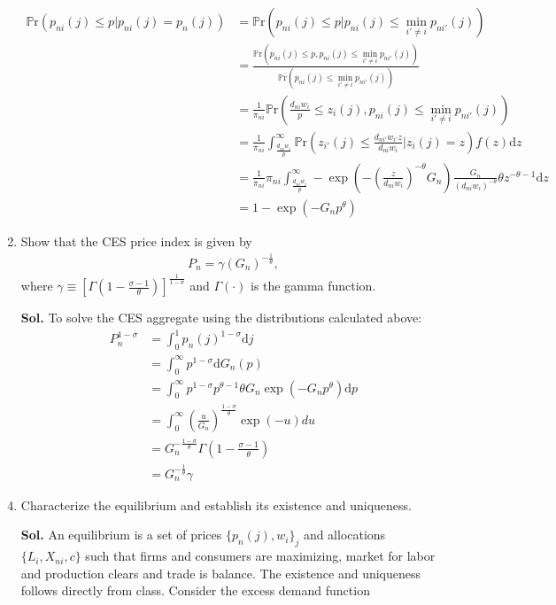 \documentclass[12pt,oneside,reqno]{amsart}
\newcommand{\pr}{\mathbb{P}\mathrm{r}}
\begin{document}
\begin{enumerate}
\begin{align*}
    \pr\left(p_{ni}(j) \leq p \vert p_{ni}(j) = p_n(j)\right) &= \pr\left(p_{ni}(j) \leq p \Big\vert p_{ni}(j) \leq \min_{i' \neq i} p_{ni'}(j)\right) \\
    &= \frac{\pr(p_{ni}(j) \leq p, p_{ni}(j) \leq \min_{i' \neq i} p_{ni'}(j))}{\pr(p_{ni}(j) \leq \min_{i' \neq i} p_{ni'}(j))} \\
    &= \frac{1}{\pi_{ni}} \pr\left(\frac{d_{ni}w_i}{p} \leq z_i(j), p_{ni}(j) \leq \min_{i' \neq i} p_{ni'}(j)\right) \\
    &= \frac{1}{\pi_{ni}} \int_{\frac{d_{ni}w_i}{p}}^\infty \pr\left(z_{i'}(j) \leq \frac{d_{ni'}w_{i'}z}{d_{ni}w_i} \Bigg\vert z_i(j) = z\right) f(z) \mathrm{d}z \\
    &= \frac{1}{\pi_{ni}} \pi_{ni} \int_{\frac{d_{ni}w_i}{p}}^\infty - \exp\left(-\left(\frac{z}{d_{ni}w_i}\right)^{-\theta} G_n \right) \frac{G_n}{(d_{ni}w_i)^{-\theta}} \theta z^{-\theta-1} \mathrm{d}z \\
    &= 1 - \exp(-G_n p^\theta)
\end{align*}
    \item Show that the CES price index is given by
    \begin{align*}
        P_n=\gamma\left(G_n\right)^{-\frac{1}{\theta}},
    \end{align*}
    where $\gamma \equiv\left[\Gamma\left(1-\frac{\sigma-1}{\theta}\right)\right]^{\frac{1}{1-\sigma}}$ and $\Gamma(\cdot)$ is the gamma function.
    \item[\textbf{Sol.}] To solve the CES aggregate using the distributions calculated above:
    \begin{align*}
    P_n^{1-\sigma} &= \int_0^1 p_n(j)^{1-\sigma} \mathrm{d}j \\
    &= \int_0^\infty p^{1-\sigma} \mathrm{d}G_n(p) \\
    &= \int_0^\infty p^{1-\sigma} p^{\theta-1} \theta G_n \exp(-G_n p^\theta) \mathrm{d}p \tag{Let $u = G_n p^\theta$} \\ 
    &= \int_0^\infty \left(\frac{u}{G_n}\right)^{\frac{1-\sigma}{\theta}} \exp(-u) du \\
    &= G_n^{-\frac{1-\sigma}{\theta}} \Gamma\left(1-\frac{\sigma-1}{\theta}\right) \\
     &= G_n^{-\frac{1}{\theta}} \gamma 
\end{align*}
    \item Characterize the equilibrium and establish its existence and uniqueness.
    \item[\textbf{Sol.}] An equilibrium is a set of prices $\{p_n(j),w_i\}_j$ and allocations $\{L_i,X_{ni},c\}$ such that firms and consumers are maximizing, market for labor and production clears and trade is balance. The existence and uniqueness follows directly from class. Consider the excess demand function 

\end{enumerate}
\end{document}
